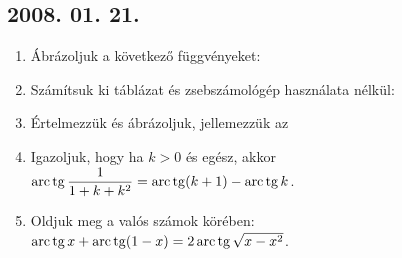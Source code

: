 \subsection*{2008. 01. 21.}
\begin{enumerate}
\item Ábrázoljuk a következő függvényeket:
\item Számítsuk ki táblázat és zsebszámológép használata nélkül:
\item Értelmezzük és ábrázoljuk, jellemezzük az
\item Igazoljuk, hogy ha $k>0$ és egész, akkor $\arc\tg \displaystyle{\frac{1}{1+k+k^2}}=\arc\tg(k+1)-\arc\tg k$.
\item Oldjuk meg a valós számok körében: $\arc \tg x+ \arc \tg(1-x)=2\arc \tg\sqrt{x-x^2}$.
\end{enumerate}

